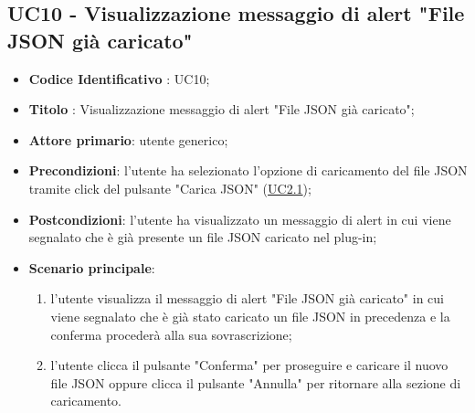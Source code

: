 
	\label{par:UC10}
	\subsection{UC10 - Visualizzazione messaggio di alert "File JSON già caricato"}
		\begin{itemize}
			\item\textbf{Codice Identificativo} : UC10;
			\item\textbf{Titolo} : Visualizzazione messaggio di alert "File JSON già caricato";
			\item\textbf{Attore primario}: utente generico;
			\item\textbf{Precondizioni}: l'utente ha selezionato l'opzione di caricamento del file JSON tramite click del pulsante "Carica JSON" (\hyperref[par:UC2.1]{UC2.1});
			\item\textbf{Postcondizioni}: l'utente ha visualizzato un messaggio di alert in cui viene segnalato che è già presente un file JSON caricato nel plug-in;
			\item\textbf{Scenario principale}:
				\begin{enumerate}
					\item l'utente visualizza il messaggio di alert "File JSON già caricato" in cui viene segnalato che è già stato caricato un file JSON in precedenza e la conferma procederà alla sua sovrascrizione;
					\item l'utente clicca il pulsante "Conferma" per proseguire e caricare il nuovo file JSON oppure clicca il pulsante "Annulla" per ritornare alla sezione di caricamento.
				\end{enumerate}
		\end{itemize}	


	\label{par:UC11}
